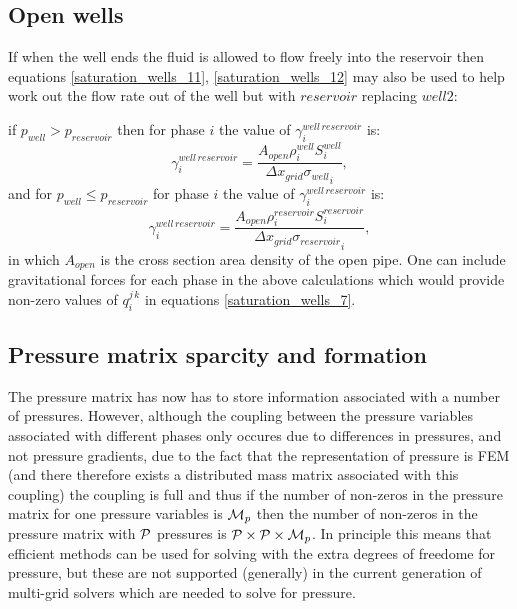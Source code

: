 \subsection{Open wells} 
\label{Mass flow rate between wells}
If when the well ends the fluid is allowed to flow freely into the reservoir 
then equations \ref{saturation_wells_11}, \ref{saturation_wells_12}  
may also be used to help work out the flow rate out of the well but with $reservoir$ replacing $well2$: 

\par\noindent
if $p_{well}>p_{reservoir}$ then for phase $i$ the value of $\gamma_i^{well\, reservoir}$ is: 
\begin{equation}
\gamma_{i}^{well\, reservoir}=\frac{ A_{open}  \rho_i^{well} S_i^{well} }{{{\Delta x}_{grid}\sigma_{well}}_i} ,
\label{saturation_wells_11}
\end{equation}
and for $p_{well}\leq p_{reservoir}$ for phase $i$ the value of $\gamma_i^{well\, reservoir}$ is:
\begin{equation}
\gamma_{i}^{well\, reservoir}=\frac{ A_{open}  \rho_i^{reservoir} S_i^{reservoir} }{{{\Delta x}_{grid}\sigma_{reservoir}}_i} ,
\label{saturation_wells_15-well10reservoir}
\end{equation}
in which $A_{open}$ is the cross section area density of the open pipe. One can include  
gravitational forces for each phase in the above calculations which would provide non-zero values 
of $q_i^{j\,k}$ in equations \ref{saturation_wells_7}. 




\subsection{Pressure matrix sparcity and formation} 
\label{Pressure matrix sparcity}
The pressure matrix has now has to store information associated with a number of pressures. 
However, although the coupling between the pressure variables associated with different phases only occures 
due to  differences in pressures, and not pressure gradients, due to the fact that the representation of 
pressure is FEM (and there therefore exists a distributed mass matrix associated with this coupling) 
the coupling is full and thus if the number of non-zeros in the pressure matrix 
for one pressure variables is ${\cal M}_p$ then the number of non-zeros in the pressure 
matrix with ${\cal P}$ pressures is  ${\cal P}\times{\cal P}\times{\cal M}_p$. 
In principle this means that efficient methods can be used for solving with the extra degrees of 
freedome for pressure, but these are not supported (generally) in the current generation of 
multi-grid solvers which are needed to solve for pressure. 

